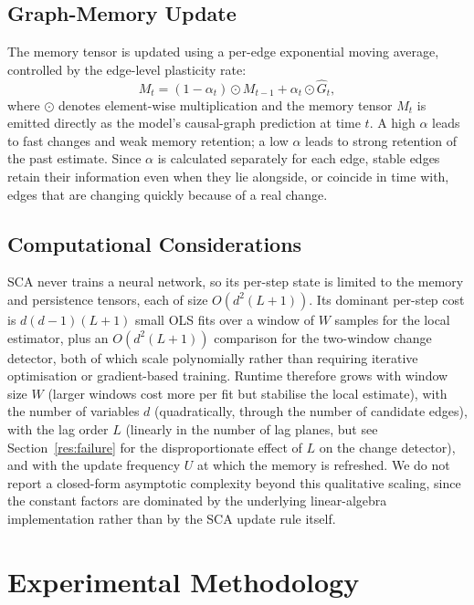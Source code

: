 \documentclass{ieeeaccess}
\newcommand{\Ghat}{\hat{G}}
\begin{document}
\subsection{Graph-Memory Update}
\label{sec:memory}
The memory tensor is updated using a per-edge exponential moving average, controlled by the edge-level plasticity rate:
\begin{equation}
M_t=(1-\alpha_t)\odot M_{t-1}+\alpha_t\odot\Ghat_t,
\label{eq:memory}
\end{equation}
where $\odot$ denotes element-wise multiplication and the memory tensor $M_t$ is emitted directly as the model's causal-graph prediction at time $t$. A high $\alpha$ leads to fast changes and weak memory retention; a low $\alpha$ leads to strong retention of the past estimate. Since $\alpha$ is calculated separately for each edge, stable edges retain their information even when they lie alongside, or coincide in time with, edges that are changing quickly because of a real change.

\subsection{Computational Considerations}
\label{sec:comp}
SCA never trains a neural network, so its per-step state is limited to the memory and persistence tensors, each of size $O(d^2(L+1))$. Its dominant per-step cost is $d(d-1)(L+1)$ small OLS fits over a window of $W$ samples for the local estimator, plus an $O(d^2(L+1))$ comparison for the two-window change detector, both of which scale polynomially rather than requiring iterative optimisation or gradient-based training. Runtime therefore grows with window size $W$ (larger windows cost more per fit but stabilise the local estimate), with the number of variables $d$ (quadratically, through the number of candidate edges), with the lag order $L$ (linearly in the number of lag planes, but see Section~\ref{res:failure} for the disproportionate effect of $L$ on the change detector), and with the update frequency $U$ at which the memory is refreshed. We do not report a closed-form asymptotic complexity beyond this qualitative scaling, since the constant factors are dominated by the underlying linear-algebra implementation rather than by the SCA update rule itself.

\section{Experimental Methodology}
\label{sec:experiments}
\end{document}
